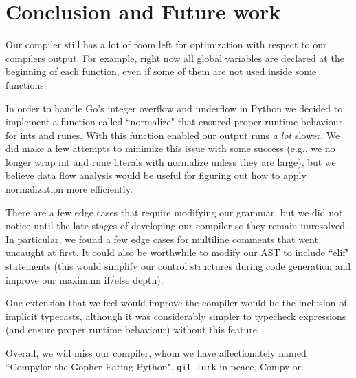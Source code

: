 \documentclass{article}
\begin{document}
\section{Conclusion and Future work}

Our compiler still has a lot of room left for optimization with respect to our compilers output. For example, right now all global variables are declared at the beginning of each function, even if some of them are not used inside some functions.

In order to handle Go's integer overflow and underflow in Python we decided to implement a function called ``normalize" that ensured proper runtime behaviour for ints and runes. With this function enabled our output runs \textit{a lot} slower. We did make a few attempts to minimize this issue with some success (e.g., we no longer wrap int and rune literals with normalize unless they are large), but we believe data flow analysis would be useful for figuring out how to apply normalization more efficiently.

There are a few edge cases that require modifying our grammar, but we did not notice until the late stages of developing our compiler so they remain unresolved. In particular, we found a few edge cases for multiline comments that went uncaught at first. It could also be worthwhile to modify our AST to include ``elif" statements (this would simplify our control structures during code generation and improve our maximum if/else depth).

One extension that we feel would improve the compiler would be the inclusion of implicit typecasts, although it was considerably simpler to typecheck expressions (and ensure proper runtime behaviour) without this feature.

Overall, we will miss our compiler, whom we have affectionately named ``Compylor the Gopher Eating Python". \lstinline|git fork| in peace, Compylor.
\end{document}
